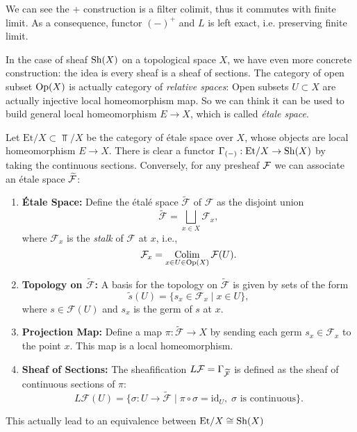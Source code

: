 \begin{remark}
  We can see the + construction is a filter colimit, thus it commutes with finite limit. As a consequence, functor $(-)^+$ and $L$ is left exact, i.e. preserving finite limit.
\end{remark}

In the case of sheaf $\mathrm{Sh}(X)$ on a topological space $X$, we have even more concrete construction: the idea is every sheaf is a sheaf of sections. The category of open subset $\mathrm{Op}(X)$ is actually category of \emph{relative spaces}: Open subsets $ U\subset X$ are actually injective local homeomorphism map. So we can think it can be used to build general local homeomorphism $E\to X$, which is called \emph{étale space}.

\begin{definition}
  Let $\mathrm{Et}/X \subset \Top / X$ be the category of étale space over $X$, whose objects are local homeomorphism $E\to X$. 
  There is clear a functor $\Gamma_{(-)}: \mathrm{Et}/X \to \mathrm{Sh}(X)$ by taking the continuous sections. Conversely, for any presheaf $\mathcal{F}$ we can associate an étale space $ \widetilde{\mathcal{F}}$:

\begin{enumerate}
    \item \textbf{Étale Space:}  
    Define the étalé space $\widetilde{\mathcal{F}}$ of $\mathcal{F}$ as the disjoint union
    \[
    \widetilde{\mathcal{F}} = \bigsqcup_{x \in X} \mathcal{F}_x,
    \]
    where $\mathcal{F}_x$ is the \emph{stalk} of $\mathcal{F}$ at $x$, i.e.,
    \[
    \mathcal{F}_x = \operatorname*{\mathrm{Colim}}_{x \in U \in \mathrm{Op}(X)} \mathcal{F}(U).
    \]

    \item \textbf{Topology on $\widetilde{\mathcal{F}}$:}  
    A basis for the topology on $\widetilde{\mathcal{F}}$ is given by sets of the form
    \[
    \widetilde{s}(U) = \{ s_x \in \mathcal{F}_x \mid x \in U \},
    \]
    where $s \in \mathcal{F}(U)$ and $s_x$ is the germ of $s$ at $x$.

    \item \textbf{Projection Map:}  
    Define a map $\pi : \widetilde{\mathcal{F}} \to X$ by sending each germ $s_x \in \mathcal{F}_x$ to the point $x$. This map is a local homeomorphism.

    \item \textbf{Sheaf of Sections:}  
      The sheafification $L\mathcal{F}=\Gamma_{\widetilde{\mathcal{F}}}$ is defined as the sheaf of continuous sections of $\pi$:
    \[
    L\mathcal{F}(U) = \{ \sigma : U \to \widetilde{\mathcal{F}} \mid \pi \circ \sigma = \mathrm{id}_U,\; \sigma \text{ is continuous} \}.
    \]
\end{enumerate}

  This actually lead to an equivalence between $\mathrm{Et}/X \cong \mathrm{Sh}(X)$ 
\end{definition}


